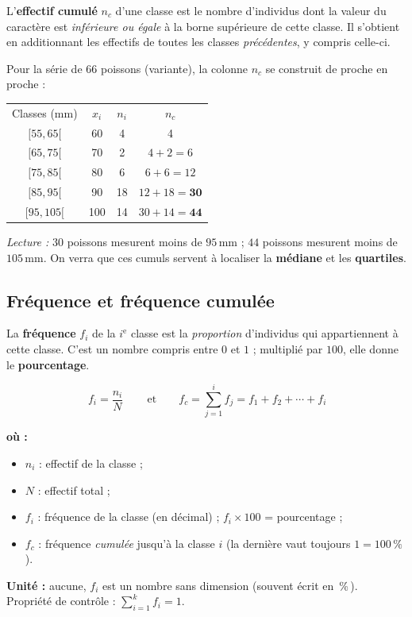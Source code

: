 \documentclass[11pt,a4paper]{article}
\newenvironment{ou}{%
  \par\smallskip\noindent\textbf{où :}\nopagebreak
  \begin{itemize}[leftmargin=1.8em,topsep=2pt,itemsep=1.5pt,parsep=0pt]}%
  {\end{itemize}}
\begin{document}
\begin{definition}
L'\textbf{effectif cumulé} $n_c$ d'une classe est le nombre d'individus dont la valeur du caractère
est \emph{inférieure ou égale} à la borne supérieure de cette classe. Il s'obtient en additionnant
les effectifs de toutes les classes \emph{précédentes}, y compris celle-ci.
\end{definition}

\begin{exemple}
Pour la série de $66$ poissons (variante), la colonne $n_c$ se construit de proche en proche :
\begin{center}
\renewcommand{\arraystretch}{1.15}
\begin{tabular}{c c c c}
\rowcolor{primary!18}
Classes (mm) & $x_i$ & $n_i$ & $n_c$ \\
$[55,65[$ & 60 & 4 & 4 \\
$[65,75[$ & 70 & 2 & $4+2=6$ \\
$[75,85[$ & 80 & 6 & $6+6=12$ \\
$[85,95[$ & 90 & 18 & $12+18=\mathbf{30}$ \\
$[95,105[$ & 100 & 14 & $30+14=\mathbf{44}$ \\
\end{tabular}
\end{center}
\emph{Lecture :} $30$ poissons mesurent moins de $95$\,mm ; $44$ poissons mesurent moins de
$105$\,mm. On verra que ces cumuls servent à localiser la \textbf{médiane} et les \textbf{quartiles}.
\end{exemple}

\subsection{Fréquence et fréquence cumulée}

\begin{definition}[fréquence]
La \textbf{fréquence} $f_i$ de la $i^{\text{e}}$ classe est la \emph{proportion} d'individus qui
appartiennent à cette classe. C'est un nombre compris entre $0$ et $1$ ; multiplié par $100$, elle
donne le \textbf{pourcentage}.
\end{definition}

\begin{formule}
\[
\boxed{\,f_i=\dfrac{n_i}{N}\,} \qquad\text{et}\qquad
f_c=\sum_{j=1}^{i} f_j = f_1+f_2+\cdots+f_i
\]
\begin{ou}
  \item $n_i$ : effectif de la classe ;
  \item $N$ : effectif total ;
  \item $f_i$ : fréquence de la classe (en décimal) ; $f_i\times 100$ = pourcentage ;
  \item $f_c$ : fréquence \emph{cumulée} jusqu'à la classe $i$ (la dernière vaut toujours $1=100\,\%$).
\end{ou}
\textbf{Unité :} aucune, $f_i$ est un nombre sans dimension (souvent écrit en \,\%\,). Propriété de
contrôle : $\displaystyle\sum_{i=1}^{k} f_i = 1$.
\end{formule}
\end{document}
